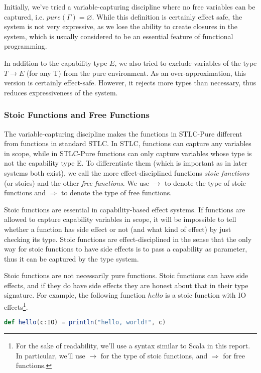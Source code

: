 Initially, we've tried a variable-capturing discipline where no free
variables can be captured, i.e. $pure(\Gamma) = \varnothing$. While
this definition is certainly effect safe, the system is not very
expressive, as we lose the ability to create closures in the system,
which is usually considered to be an essential feature of functional
programming.

In addition to the capability type $E$, we also tried to exclude
variables of the type $T \to E$ (for any T) from the pure
environment. As an over-approximation, this version is certainly
effect-safe. However, it rejects more types than necessary, thus
reduces expressiveness of the system.

\subsubsection{Stoic Functions and Free Functions}

The variable-capturing discipline makes the functions in STLC-Pure
different from functions in standard STLC. In STLC, functions can
capture any variables in scope, while in STLC-Pure functions can only
capture variables whose type is not the capability type E. To
differentiate them (which is important as in later systems both
exist), we call the more effect-disciplined functions \emph{stoic
  functions} (or stoics) and the other \emph{free functions}. We use
$\to$ to denote the type of stoic functions and $\Rightarrow$ to
denote the type of free functions.

Stoic functions are essential in capability-based effect systems. If
functions are allowed to capture capability variables in scope, it
will be impossible to tell whether a function has side effect or not
(and what kind of effect) by just checking its type. Stoic functions
are effect-disciplined in the sense that the only way for stoic
functions to have side effects is to pass a capability as parameter,
thus it can be captured by the type system.

Stoic functions are not necessarily pure functions. Stoic functions
can have side effects, and if they do have side effects they are
honest about that in their type signature. For example, the following
function $hello$ is a stoic function with IO effects\footnote{For the
  sake of readability, we'll use a syntax similar to Scala in this
  report. In particular, we'll use $\to$ for the type of stoic
  functions, and $\Rightarrow$ for free functions.}.

\begin{lstlisting}[language=Scala]
  def hello(c:IO) = println("hello, world!", c)
\end{lstlisting}

